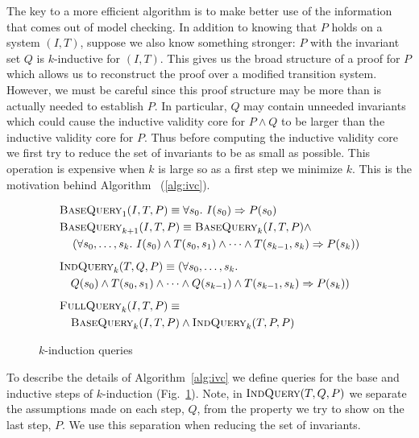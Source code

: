 The key to a more efficient algorithm is to make better use of the
information that comes out of model checking. In addition to knowing
that $P$ holds on a system $(I, T)$, suppose we also know something
stronger: $P$ with the invariant set $Q$ is $k$-inductive for $(I,
T)$. This gives us the broad structure of a proof for $P$ which allows
us to reconstruct the proof over a modified transition system.
However, we must be careful since this proof structure may be more
than is actually needed to establish $P$. In particular, $Q$ may
contain unneeded invariants which could cause the inductive validity
core for $P \land Q$ to be larger than the inductive validity core for
$P$. Thus before computing the inductive validity core we first try to
reduce the set of invariants to be as small as possible. This
operation is expensive when $k$ is large so as a first step we
minimize $k$. This is the motivation behind
Algorithm \ucalg~(\ref{alg:ivc}).

\begin{figure}
\begin{align*}
  &\bq_1(I, T, P) \equiv \forall s_0.~ I(s_0) \Rightarrow P(s_0) \\
  &\bq_{k+1}(I, T, P) \equiv \bq_k(I, T, P) \land~ \\
%
  &\hspace{10pt}\left(\forall s_0, \ldots, s_k.~ I(s_0) \land T(s_0,
  s_1) \land \cdots \land T(s_{k-1}, s_k) \Rightarrow P(s_k)\right)
  \\[5pt]
  &\iq_k(T, Q, P) \equiv (\forall s_0, \ldots, s_k.~\\
%
  &\hspace{10pt} Q(s_0) \land T(s_0,
  s_1) \land \cdots \land Q(s_{k-1}) \land T(s_{k-1}, s_k) \Rightarrow
  P(s_k)) \\[5pt]
  &\fq_k(I, T, P) \equiv \\
%
  &\hspace{10pt}\bq_k(I, T, P) \land \iq_k(T, P, P)
\end{align*}
\caption{$k$-induction queries}
\label{fig:queries}
\end{figure}

To describe the details of Algorithm~\ref{alg:ivc} we define queries
for the base and inductive steps of $k$-induction
(Fig.~\ref{fig:queries}). Note, in $\textsc{IndQuery}(T, Q, P)$ we separate the
assumptions made on each step, $Q$, from the property we try to show
on the last step, $P$. We use this separation when reducing the set of
invariants.

